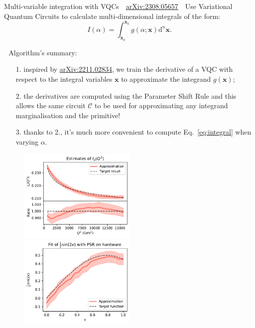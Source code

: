 \documentclass[8pt, xcolor={svgnames}]{beamer}
\begin{document}
\begin{frame}{Multi-variable integration with VQCs \hfill \faBook\,\, \href{https://arxiv.org/abs/2308.05657}{arXiv:2308.05657}}
\small
\faCrosshairs\,\, Use Variational Quantum Circuits to calculate multi-dimensional 
integrals of the form:
\begin{equation}
I(\alpha) = \int_{\bm{x}_a}^{\bm{x}_b} g(\alpha; \bm{x}) \text{d}^n \bm{x}.
\label{eq:integral}
\end{equation}

\faFlash\,\, Algorithm's summary:

\begin{itemize}[noitemsep]
\item[1.] inspired by \href{https://arxiv.org/abs/2211.02834}{arXiv:2211.02834}, 
we train the derivative of a VQC with respect to the integral variables $\bm{x}$ to approximate 
the integrand $g(\bm{x})$;
\item[2.] the derivatives are computed using the Parameter Shift Rule and this
allows the same circuit $\mathcal{C}$ to be used for approximating any integrand 
marginalisation and the primitive!
\item[3.] thanks to 2., it's much more convenient to compute Eq.~\eqref{eq:integral}
when varying $\alpha$.
\end{itemize}
\begin{figure}  
    \includegraphics[width=0.5\textwidth]{figures/uquark2d.pdf}%
    \includegraphics[width=0.5\textwidth]{figures/hardware_int.pdf}
\end{figure}
\end{frame}
\end{document}
